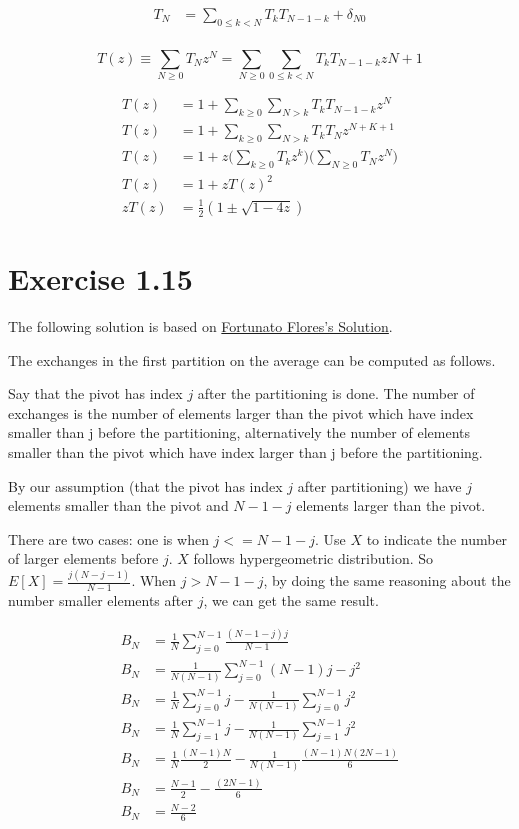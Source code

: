 \documentclass{book}
\begin{document}
\begin{align*}
  T_{N} &= \sum_{0 \le k < N} T_{k}T_{N-1-k} + \delta_{N0} \\
\end{align*}

\begin{equation}
  T(z) \equiv \sum_{N \ge 0}T_{N}z^{N} = \sum_{N \ge 0}\sum_{0 \le k < N}
  T_{k}T_{N-1-k}z{N} + 1
\end{equation}

\begin{align*}
  T(z) &= 1 + \sum_{k \ge 0}\sum_{N > k}T_{k}T_{N-1-k}z^N \\
  T(z) &= 1 + \sum_{k \ge 0}\sum_{N > k}T_{k}T_{N}z^{N+K+1} \\
  T(z) &= 1 + z\bigg(\sum_{k \ge 0} T_k z^k\bigg)\bigg(\sum_{N \ge 0} T_N z^N \bigg) \\
  T(z) &= 1 + zT(z)^2 \\
  zT(z) & = \frac{1}{2}(1\pm\sqrt{1-4z})
\end{align*}

\section*{Exercise 1.15}

The following solution is based on \href{https://class.coursera.org/aofa-006/forum/thread?thread\_id=12}{Fortunato Flores's Solution}.

The exchanges in the first partition on the average can be computed as follows.

Say that the pivot has index $j$ after the partitioning is done. The number of
exchanges is the number of elements larger than the pivot which have index
smaller than j before the partitioning, alternatively the number of elements
smaller than the pivot which have index larger than j before the partitioning.


By our assumption (that the pivot has index $j$ after partitioning) we have $j$
elements smaller than the pivot and $N-1-j$ elements larger than the pivot.

There are two cases: one is when $j <= N-1-j$. Use $X$ to indicate the number of
larger elements before $j$. $X$ follows hypergeometric distribution. So $E[X] =
\frac{j(N-j-1)}{N-1}$. When $j > N-1-j$, by doing the same reasoning about the
number smaller elements after $j$, we can get the same result.

\begin{align*}
  B_{N} &= \frac{1}{N}\sum_{j=0}^{N-1}\frac{(N-1-j)j}{N-1} \\
  B_{N} &= \frac{1}{N(N-1)}\sum_{j=0}^{N-1}(N-1)j - j^2 \\
  B_{N} &= \frac{1}{N}\sum_{j=0}^{N-1}j - \frac{1}{N(N-1)}\sum_{j=0}^{N-1}j^2 \\
  B_{N} &= \frac{1}{N}\sum_{j=1}^{N-1}j - \frac{1}{N(N-1)}\sum_{j=1}^{N-1}j^2 \\
  B_{N} &= \frac{1}{N} \frac{(N-1)N}{2}- \frac{1}{N(N-1)}\frac{(N-1)N(2N-1)}{6} \\
  B_{N} &= \frac{N-1}{2} - \frac{(2N-1)}{6} \\
  B_{N} &= \frac{N-2}{6}\\
\end{align*}
\end{document}
